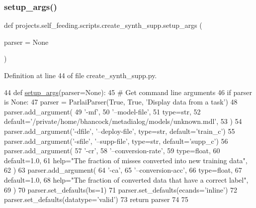 \subsubsection{\texorpdfstring{setup\+\_\+args()}{setup\_args()}}
{\footnotesize\ttfamily def projects.\+self\+\_\+feeding.\+scripts.\+create\+\_\+synth\+\_\+supp.\+setup\+\_\+args (\begin{DoxyParamCaption}\item[{}]{parser = {\ttfamily None} }\end{DoxyParamCaption})}



Definition at line 44 of file create\+\_\+synth\+\_\+supp.\+py.


\begin{DoxyCode}
44 \textcolor{keyword}{def }\hyperlink{namespaceprojects_1_1self__feeding_1_1scripts_1_1create__synth__supp_ac102836989a094f474dc72bb0aea814e}{setup\_args}(parser=None):
45     \textcolor{comment}{# Get command line arguments}
46     \textcolor{keywordflow}{if} parser \textcolor{keywordflow}{is} \textcolor{keywordtype}{None}:
47         parser = ParlaiParser(\textcolor{keyword}{True}, \textcolor{keyword}{True}, \textcolor{stringliteral}{'Display data from a task'})
48     parser.add\_argument(
49         \textcolor{stringliteral}{'-mf'},
50         \textcolor{stringliteral}{'--model-file'},
51         type=str,
52         default=\textcolor{stringliteral}{'/private/home/bhancock/metadialog/models/unknown.mdl'},
53     )
54     parser.add\_argument(\textcolor{stringliteral}{'-dfile'}, \textcolor{stringliteral}{'--deploy-file'}, type=str, default=\textcolor{stringliteral}{'train\_c'})
55     parser.add\_argument(\textcolor{stringliteral}{'-sfile'}, \textcolor{stringliteral}{'--supp-file'}, type=str, default=\textcolor{stringliteral}{'supp\_c'})
56     parser.add\_argument(
57         \textcolor{stringliteral}{'-cr'},
58         \textcolor{stringliteral}{'--conversion-rate'},
59         type=float,
60         default=1.0,
61         help=\textcolor{stringliteral}{"The fraction of misses converted into new training data"},
62     )
63     parser.add\_argument(
64         \textcolor{stringliteral}{'-ca'},
65         \textcolor{stringliteral}{'--conversion-acc'},
66         type=float,
67         default=1.0,
68         help=\textcolor{stringliteral}{"The fraction of converted data that have a correct label"},
69     )
70     parser.set\_defaults(bs=1)
71     parser.set\_defaults(ecands=\textcolor{stringliteral}{'inline'})
72     parser.set\_defaults(datatype=\textcolor{stringliteral}{'valid'})
73     \textcolor{keywordflow}{return} parser
74 
75 
\end{DoxyCode}


